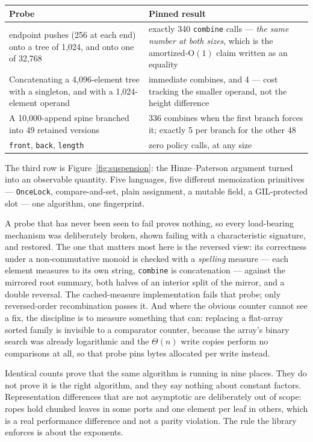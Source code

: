 \documentclass[11pt,twoside,openright]{book}
\makeatletter
\newcommand{\code}[1]{\texorpdfstring{\textcolor{d7ink}{\texttt{#1}}}{#1}}
\newcommand{\bigoh}[1]{$\mathrm{O}(#1)$}
\newenvironment{d7table}[1]
  {\par\vspace{3pt}\small
   \setlength{\LTpre}{4pt}\setlength{\LTpost}{4pt}
   \begin{longtable}{@{}%
     >{\raggedright\arraybackslash}p{#1\textwidth}%
     @{\hspace{10pt}}%
     >{\raggedright\arraybackslash}p{\dimexpr\textwidth-#1\textwidth-10pt\relax}@{}}}
  {\end{longtable}}
\newcommand{\thead}[1]{\sffamily\bfseries\footnotesize\color{d7ink}#1}
\makeatother
\begin{document}
\begin{d7table}{0.44}
\toprule
\thead{Probe} & \thead{Pinned result} \\
\midrule
512 endpoint pushes (256 at each end) onto a tree of 1{,}024, and onto one of
32{,}768 & exactly 340 \code{combine} calls --- \emph{the same number at both
sizes}, which is the amortized-\bigoh{1} claim written as an equality \\
Concatenating a 4{,}096-element tree with a singleton, and with a
1{,}024-element operand & 0 immediate combines, and 4 --- cost tracking the
smaller operand, not the height difference \\
A 10{,}000-append spine branched into 49 retained versions & 3{,}336 combines
when the first branch forces it; exactly 5 per branch for the other 48 \\
\code{front}, \code{back}, \code{length} & zero policy calls, at any size \\
\bottomrule
\end{d7table}

The third row is Figure~\ref{fig:suspension}: the Hinze--Paterson argument turned
into an observable quantity. Five languages, five different memoization
primitives --- \code{OnceLock}, compare-and-set, plain assignment, a mutable
field, a GIL-protected slot --- one algorithm, one fingerprint.

A probe that has never been seen to fail proves nothing, so every load-bearing
mechanism was deliberately broken, shown failing with a characteristic
signature, and restored. The one that matters most here is the reversed view: its
correctness under a non-commutative monoid is checked with a \emph{spelling}
measure --- each element measures to its own string, \code{combine} is
concatenation --- against the mirrored root summary, both halves of an interior
split of the mirror, and a double reversal. The cached-measure implementation
fails that probe; only reversed-order recombination passes it. And where the
obvious counter cannot see a fix, the discipline is to measure something that
can: replacing a flat-array sorted family is invisible to a comparator counter,
because the array's binary search was already logarithmic and the $\Theta(n)$
write copies perform no comparisons at all, so that probe pins bytes allocated
per write instead.

\begin{caveatbox}
Identical counts prove that the same algorithm is running in nine places. They do
not prove it is the right algorithm, and they say nothing about constant factors.
Representation differences that are not asymptotic are deliberately out of scope:
ropes hold chunked leaves in some ports and one element per leaf in others, which
is a real performance difference and not a parity violation. The rule the library
enforces is about the exponents.
\end{caveatbox}
\end{document}

